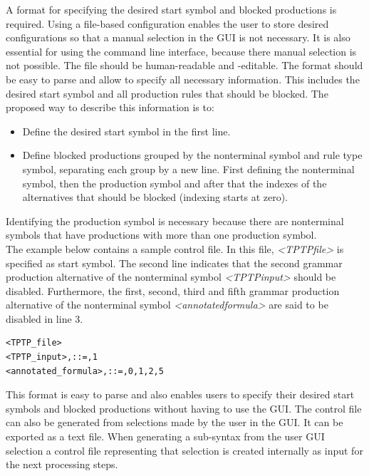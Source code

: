 A format for specifying the desired start symbol and blocked productions is required.
Using a file-based configuration enables the user to store desired configurations so that a manual selection in the GUI is not necessary.
It is also essential for using the command line interface, because there manual selection is not possible.
The file should be human-readable and -editable.
The format should be easy to parse and allow to specify all necessary information.
This includes the desired start symbol and all production rules that should be blocked.
The proposed way to describe this information is to:

\begin{itemize}%
	\item Define the desired start symbol in the first line.
	\item Define blocked productions grouped by the nonterminal symbol and rule type symbol, separating each group by a new line.
	First defining the nonterminal symbol, then the production symbol and after that the indexes of the alternatives that should be blocked (indexing starts at zero).
\end{itemize}
Identifying the production symbol is necessary because there are nonterminal symbols that have productions with more than one production symbol.\\
The example below contains a sample control file.
In this file, \textit{\textless TPTP\textunderscore file\textgreater} is specified as start symbol.
The second line indicates that the second grammar production alternative of the nonterminal symbol \textit{\textless TPTP\textunderscore input\textgreater} should be disabled.
Furthermore, the first, second, third and fifth grammar production alternative of the nonterminal symbol \textit{\textless annotated\textunderscore formula\textgreater} are said to be disabled in line 3.

\begin{lstlisting}[caption= Control file example,label= lst:ConceptControlFile]
<TPTP_file>
<TPTP_input>,::=,1
<annotated_formula>,::=,0,1,2,5
\end{lstlisting}
This format is easy to parse and also enables users to specify their desired start symbols and blocked productions without having to use the GUI. The control file can also be generated from selections made by the user in the GUI.
It can be exported as a text file.
When generating a sub-syntax from the user GUI selection a control file representing that selection is created internally as input for the next processing steps.

